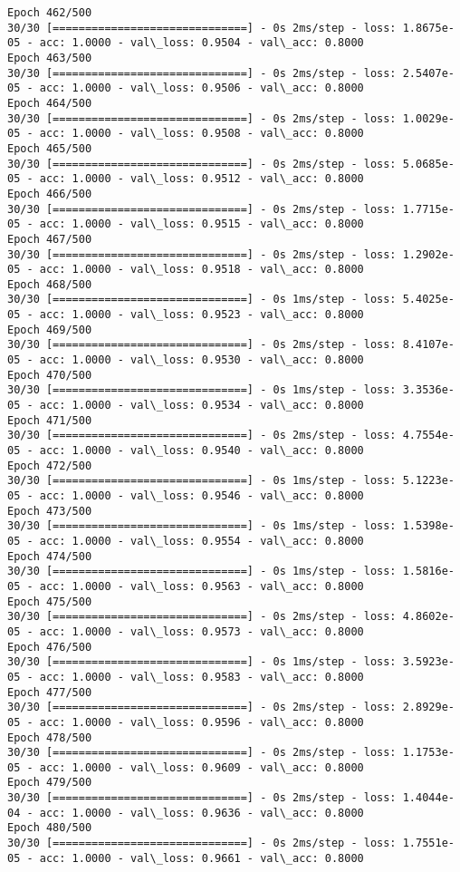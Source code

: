 \documentclass[11pt]{article}
\begin{document}
\begin{Verbatim}[commandchars=\\\{\}]
Epoch 462/500
30/30 [==============================] - 0s 2ms/step - loss: 1.8675e-05 - acc: 1.0000 - val\_loss: 0.9504 - val\_acc: 0.8000
Epoch 463/500
30/30 [==============================] - 0s 2ms/step - loss: 2.5407e-05 - acc: 1.0000 - val\_loss: 0.9506 - val\_acc: 0.8000
Epoch 464/500
30/30 [==============================] - 0s 2ms/step - loss: 1.0029e-05 - acc: 1.0000 - val\_loss: 0.9508 - val\_acc: 0.8000
Epoch 465/500
30/30 [==============================] - 0s 2ms/step - loss: 5.0685e-05 - acc: 1.0000 - val\_loss: 0.9512 - val\_acc: 0.8000
Epoch 466/500
30/30 [==============================] - 0s 2ms/step - loss: 1.7715e-05 - acc: 1.0000 - val\_loss: 0.9515 - val\_acc: 0.8000
Epoch 467/500
30/30 [==============================] - 0s 2ms/step - loss: 1.2902e-05 - acc: 1.0000 - val\_loss: 0.9518 - val\_acc: 0.8000
Epoch 468/500
30/30 [==============================] - 0s 1ms/step - loss: 5.4025e-05 - acc: 1.0000 - val\_loss: 0.9523 - val\_acc: 0.8000
Epoch 469/500
30/30 [==============================] - 0s 2ms/step - loss: 8.4107e-05 - acc: 1.0000 - val\_loss: 0.9530 - val\_acc: 0.8000
Epoch 470/500
30/30 [==============================] - 0s 1ms/step - loss: 3.3536e-05 - acc: 1.0000 - val\_loss: 0.9534 - val\_acc: 0.8000
Epoch 471/500
30/30 [==============================] - 0s 2ms/step - loss: 4.7554e-05 - acc: 1.0000 - val\_loss: 0.9540 - val\_acc: 0.8000
Epoch 472/500
30/30 [==============================] - 0s 1ms/step - loss: 5.1223e-05 - acc: 1.0000 - val\_loss: 0.9546 - val\_acc: 0.8000
Epoch 473/500
30/30 [==============================] - 0s 1ms/step - loss: 1.5398e-05 - acc: 1.0000 - val\_loss: 0.9554 - val\_acc: 0.8000
Epoch 474/500
30/30 [==============================] - 0s 1ms/step - loss: 1.5816e-05 - acc: 1.0000 - val\_loss: 0.9563 - val\_acc: 0.8000
Epoch 475/500
30/30 [==============================] - 0s 2ms/step - loss: 4.8602e-05 - acc: 1.0000 - val\_loss: 0.9573 - val\_acc: 0.8000
Epoch 476/500
30/30 [==============================] - 0s 1ms/step - loss: 3.5923e-05 - acc: 1.0000 - val\_loss: 0.9583 - val\_acc: 0.8000
Epoch 477/500
30/30 [==============================] - 0s 2ms/step - loss: 2.8929e-05 - acc: 1.0000 - val\_loss: 0.9596 - val\_acc: 0.8000
Epoch 478/500
30/30 [==============================] - 0s 2ms/step - loss: 1.1753e-05 - acc: 1.0000 - val\_loss: 0.9609 - val\_acc: 0.8000
Epoch 479/500
30/30 [==============================] - 0s 2ms/step - loss: 1.4044e-04 - acc: 1.0000 - val\_loss: 0.9636 - val\_acc: 0.8000
Epoch 480/500
30/30 [==============================] - 0s 2ms/step - loss: 1.7551e-05 - acc: 1.0000 - val\_loss: 0.9661 - val\_acc: 0.8000

\end{Verbatim}
\end{document}
